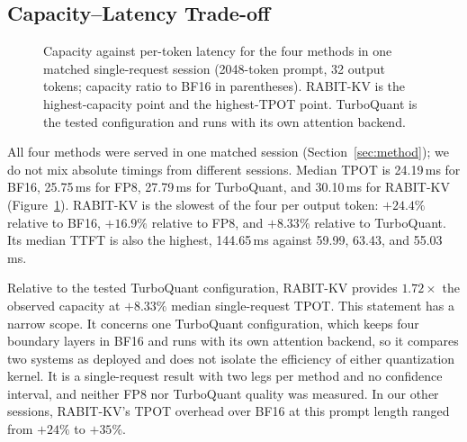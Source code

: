 \documentclass{article}
\begin{document}
\subsection{Capacity--Latency Trade-off}
\label{sec:tradeoff}

\begin{figure}[t]
\centering
{}
\caption{Capacity against per-token latency for the four methods in one matched single-request session
(2048-token prompt, 32 output tokens; capacity ratio to BF16 in parentheses). RABIT-KV is the
highest-capacity point and the highest-TPOT point. TurboQuant is the tested configuration and runs
with its own attention backend.}
\label{fig:tradeoff}
\end{figure}

All four methods were served in one matched session (Section~\ref{sec:method}); we do not mix absolute
timings from different sessions. Median TPOT is 24.19\,ms for BF16, 25.75\,ms for FP8, 27.79\,ms for
TurboQuant, and 30.10\,ms for RABIT-KV (Figure~\ref{fig:tradeoff}). RABIT-KV is the slowest of the four
per output token: $+24.4\%$ relative to BF16, $+16.9\%$ relative to FP8, and $+8.33\%$ relative to
TurboQuant. Its median TTFT is also the highest, 144.65\,ms against 59.99, 63.43, and 55.03\,ms.

Relative to the tested TurboQuant configuration, RABIT-KV provides $1.72\times$ the observed
capacity at $+8.33\%$ median single-request TPOT. This
statement has a narrow scope. It concerns one TurboQuant configuration, which keeps four boundary
layers in BF16 and runs with its own attention backend, so it compares two systems as deployed and does
not isolate the efficiency of either quantization kernel. It is a single-request result with two legs
per method and no confidence interval, and neither FP8 nor TurboQuant quality was measured. In our
other sessions, RABIT-KV's TPOT overhead over BF16 at this prompt length ranged from $+24\%$ to
$+35\%$.
\end{document}

